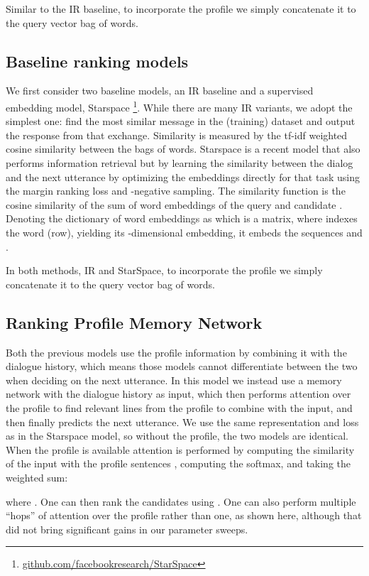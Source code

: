 \documentclass[11pt,a4paper]{article}
\begin{document}
Similar to the IR baseline, to incorporate the profile we simply concatenate it to the query vector bag of words. 
\else
\subsection{Baseline ranking models}
We first consider two baseline models, 
an IR baseline \cite{sordoni2015neural} and a supervised embedding model, Starspace \cite{wu2017starspace}\footnote{\url{github.com/facebookresearch/StarSpace}}. While there are many IR variants, we adopt the simplest one: find the most similar message in the (training) dataset and output the response from that exchange. Similarity is measured by the tf-idf weighted cosine similarity between the bags of words. 
Starspace is a recent model that also performs information retrieval but by learning the similarity
between the dialog and the next utterance by optimizing the embeddings directly for that task using the margin ranking loss and -negative sampling. The similarity function  is the cosine similarity of the sum of word embeddings of the query  and candidate . Denoting the dictionary of  word embeddings as  which is a  matrix, where  indexes the  word (row), yielding its -dimensional embedding, it embeds the sequences  and .


In both methods, IR and StarSpace, to incorporate the profile we simply concatenate it to the query vector bag of words. 
\fi

\subsection{Ranking Profile Memory Network}

Both the previous models use the profile information by combining it 
with the dialogue history, which means those models cannot differentiate between the two when deciding on the next utterance. In this model we instead use a memory network with the dialogue history as input, which then performs attention over the profile to find relevant lines from the profile to combine with the input, and then finally predicts the next utterance. We use the same representation and loss as in the Starspace model, so without the profile, the two models are identical.
When the profile is available attention is performed by computing the similarity of the input  with the profile sentences , computing the softmax, and taking the weighted sum:

where .
One can then rank the candidates  using .
One can also perform multiple ``hops'' of attention over the profile rather than one, as shown here, although that did not bring significant gains in our parameter sweeps. 
\end{document}
